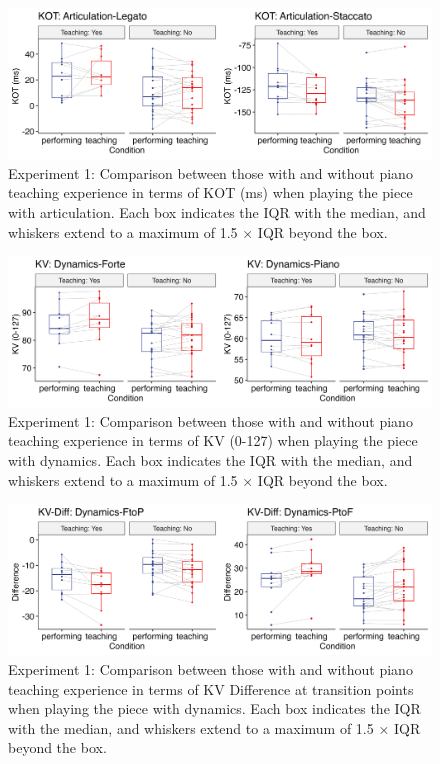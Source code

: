 \documentclass[
  man,floatsintext]{apa6}
\begin{document}
\begin{figure}
\includegraphics[width=1\linewidth]{manuscript_files/figure-latex/plot-art-teaching-1-1} \caption{\label{fig:art-teaching-1}Experiment 1: Comparison between those with and without piano teaching experience in terms of KOT (ms) when playing the piece with articulation. Each box indicates the IQR with the median, and whiskers extend to a maximum of 1.5 × IQR beyond the box.}\label{fig:plot-art-teaching-1}
\end{figure}

\begin{figure}
\includegraphics[width=1\linewidth]{manuscript_files/figure-latex/plot-dyn-teaching-1-1} \caption{\label{fig:dyn-teaching-1}Experiment 1: Comparison between those with and without piano teaching experience in terms of KV (0-127) when playing the piece with dynamics. Each box indicates the IQR with the median, and whiskers extend to a maximum of 1.5 × IQR beyond the box.}\label{fig:plot-dyn-teaching-1}
\end{figure}

\begin{figure}
\includegraphics[width=1\linewidth]{manuscript_files/figure-latex/plot-dyn-diff-teaching-1-1} \caption{\label{fig:dyn-diff-teaching-1}Experiment 1: Comparison between those with and without piano teaching experience in terms of KV Difference at transition points when playing the piece with dynamics. Each box indicates the IQR with the median, and whiskers extend to a maximum of 1.5 × IQR beyond the box.}\label{fig:plot-dyn-diff-teaching-1}
\end{figure}
\end{document}
